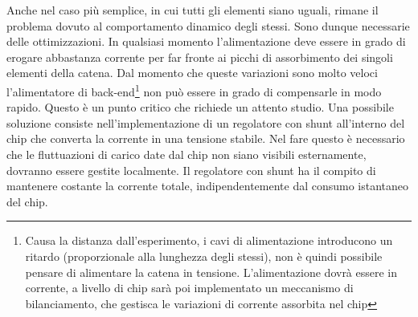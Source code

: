 Anche nel caso più semplice, in cui tutti gli elementi siano uguali, rimane il problema dovuto al comportamento dinamico degli stessi. Sono dunque necessarie delle ottimizzazioni. 
In qualsiasi momento l'alimentazione deve essere in grado di erogare abbastanza corrente per far fronte ai picchi di assorbimento dei singoli elementi della catena. 
Dal momento che queste variazioni sono molto veloci l'alimentatore di back-end\footnote{Causa la distanza dall'esperimento, i cavi di alimentazione introducono un ritardo (proporzionale alla lunghezza degli stessi), non è quindi possibile pensare di alimentare la catena in tensione. L'alimentazione dovrà essere in corrente, a livello di chip sarà poi implementato un meccanismo di bilanciamento, che gestisca le variazioni di corrente assorbita nel chip}
non può essere in grado di compensarle in modo rapido. Questo è un punto critico che richiede un attento studio. 
Una possibile soluzione consiste nell'implementazione di un regolatore con shunt all'interno del chip che converta la corrente in una tensione stabile. 
Nel fare questo è necessario che le fluttuazioni di carico date dal chip non siano visibili esternamente, dovranno essere gestite localmente. 
Il regolatore con shunt ha il compito di mantenere costante la corrente totale, indipendentemente dal consumo istantaneo del chip.

